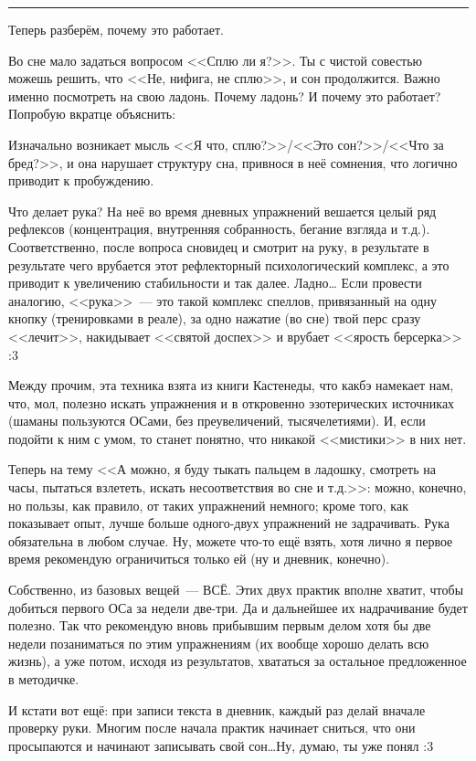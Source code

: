 \documentclass[a4paper,14pt,oneside]{memoir}
\begin{document}
\smallskip
\fancybreak{* * *}

Теперь разберём, почему это работает.

Во сне мало задаться вопросом <<Сплю ли я?>>. Ты с чистой совестью можешь решить, что <<Не, нифига, не сплю>>, и сон продолжится. Важно именно посмотреть на свою ладонь. Почему ладонь? И почему это работает? Попробую вкратце объяснить:

Изначально возникает мысль <<Я что, сплю?>>/<<Это сон?>>/<<Что за бред?>>, и она нарушает структуру сна, привнося в неё сомнения, что логично приводит к пробуждению.

Что делает рука? На неё во время дневных упражнений вешается целый ряд рефлексов (концентрация, внутренняя собранность, бегание взгляда и т.д.). Соответственно, после вопроса сновидец и смотрит на руку, в результате в результате чего врубается этот рефлекторный психологический комплекс, а это приводит к увеличению стабильности и так далее.
Ладно\ldots{} Если провести аналогию, <<рука>>~--- это такой комплекс спеллов, привязанный на одну кнопку (тренировками в реале), за одно нажатие (во сне) твой перс сразу <<лечит>>, накидывает <<святой доспех>> и врубает <<ярость берсерка>> :3

Между прочим, эта техника взята из книги Кастенеды, что какбэ намекает нам, что, мол, полезно искать упражнения и в откровенно эзотерических источниках (шаманы пользуются ОСами, без преувеличений, тысячелетиями). И, если подойти к ним с умом, то станет понятно, что никакой <<мистики>> в них нет. 

Теперь на тему <<А можно, я буду тыкать пальцем в ладошку, смотреть на часы, пытаться взлететь, искать несоответствия во сне и т.д.>>: можно, конечно, но пользы, как правило, от таких упражнений немного; кроме того, как показывает опыт, лучше больше одного-двух упражнений не задрачивать. Рука обязательна в любом случае. Ну, можете что-то ещё взять, хотя лично я первое время рекомендую ограничиться только ей (ну и дневник, конечно).

Собственно, из базовых вещей~--- ВСЁ. Этих двух практик вполне хватит, чтобы добиться первого ОСа за недели две-три. Да и дальнейшее их надрачивание будет полезно.
Так что рекомендую вновь прибывшим первым делом хотя бы две недели позаниматься по этим упражнениям (их вообще хорошо делать всю жизнь), а уже потом, исходя из результатов, хвататься за остальное предложенное в методичке. 

И кстати вот ещё: при записи текста в дневник, каждый раз делай вначале проверку руки. Многим после начала практик начинает сниться, что они просыпаются и начинают записывать свой сон\ldots Ну, думаю, ты уже понял :3 
\end{document}

